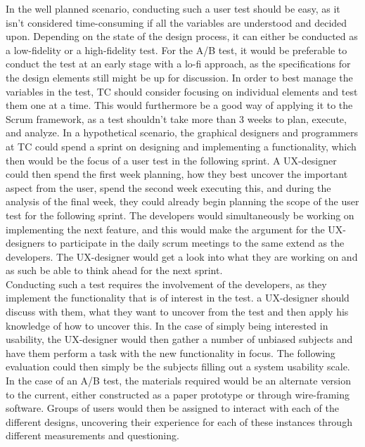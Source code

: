 \noindent
In the well planned scenario, conducting such a user test should be easy, as it isn't considered time-consuming if all the variables are understood and decided upon. Depending on the state of the design process, it can either be conducted as a low-fidelity or a high-fidelity test. For the A/B test, it would be preferable to conduct the test at an early stage with a lo-fi approach, as the specifications for the design elements still might be up for discussion. In order to best manage the variables in the test, TC should consider focusing on individual elements and test them one at a time. This would furthermore be a good way of applying it to the Scrum framework, as a test shouldn't take more than 3 weeks to plan, execute, and analyze. In a hypothetical scenario, the graphical designers and programmers at TC could spend a sprint on designing and implementing a functionality, which then would be the focus of a user test in the following sprint. A UX-designer could then spend the first week planning, how they best uncover the important aspect from the user, spend the second week executing this, and during the analysis of the final week, they could already begin planning the scope of the user test for the following sprint. The developers would simultaneously be working on implementing the next feature, and this would make the argument for the UX-designers to participate in the daily scrum meetings to the same extend as the developers. The UX-designer would get a look into what they are working on and as such be able to think ahead for the next sprint.\\

\noindent
Conducting such a test requires the involvement of the developers, as they implement the functionality that is of interest in the test. a UX-designer should discuss with them, what they want to uncover from the test and then apply his knowledge of how to uncover this. In the case of simply being interested in usability, the UX-designer would then gather a number of unbiased subjects and have them perform a task with the new functionality in focus. The following evaluation could then simply be the subjects filling out a system usability scale. In the case of an A/B test, the materials required would be an alternate version to the current, either constructed as a paper prototype or through wire-framing software. Groups of users would then be assigned to interact with each of the different designs, uncovering their experience for each of these instances through different measurements and questioning. 


